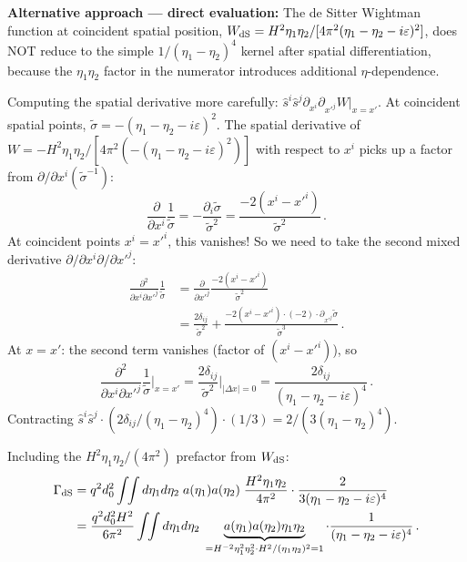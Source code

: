 \documentclass[12pt]{article}
\newcommand{\Scfac}{a}
\newcommand{\Wight}{W}
\begin{document}
\medskip

\noindent
\textbf{Alternative approach — direct evaluation:}
The de Sitter Wightman function at coincident spatial position,
$\Wight_{\rm dS} = H^{2}\eta_{1}\eta_{2}/[4\pi^{2}(\eta_{1}-\eta_{2}-i\varepsilon)^{2}]$,
does NOT reduce to the simple $1/(\eta_1-\eta_2)^4$ kernel after spatial differentiation,
because the $\eta_{1}\eta_{2}$ factor in the numerator introduces additional $\eta$-dependence.

Computing the spatial derivative more carefully:
$\hat{s}^{i}\hat{s}^{j}\partial_{x^i}\partial_{x'^j}\Wight|_{x=x'}$.
At coincident spatial points, $\tilde\sigma = -(\eta_1-\eta_2-i\varepsilon)^2$.
The spatial derivative of $\Wight = -H^{2}\eta_{1}\eta_{2}/[4\pi^{2}(-(\eta_1-\eta_2-i\varepsilon)^2)]$
with respect to $x^{i}$ picks up a factor from $\partial/\partial x^i(\tilde\sigma^{-1})$:
%
\begin{equation}
  \frac{\partial}{\partial x^{i}}\frac{1}{\tilde\sigma}
  =
  -\frac{\partial_i\tilde\sigma}{\tilde\sigma^{2}}
  =
  \frac{-2(x^{i}-x'^{i})}{\tilde\sigma^{2}} \,.
\end{equation}
%
At coincident points $x^{i}=x'^{i}$, this vanishes!  So we need to take the second
mixed derivative $\partial/\partial x^{i}\partial/\partial x'^{j}$:
%
\begin{align}
  \frac{\partial^{2}}{\partial x^{i}\partial x'^{j}}\frac{1}{\tilde\sigma}
  &=
  \frac{\partial}{\partial x'^{j}}\frac{-2(x^{i}-x'^{i})}{\tilde\sigma^{2}} \nonumber\\
  &=
  \frac{2\delta_{ij}}{\tilde\sigma^{2}}
  +\frac{-2(x^{i}-x'^{i})\cdot(-2)\cdot\partial_{x'^{j}}\tilde\sigma}{\tilde\sigma^{3}} \,.
\end{align}
%
At $x=x'$: the second term vanishes (factor of $(x^{i}-x'^{i})$), so
%
\begin{equation}
  \frac{\partial^{2}}{\partial x^{i}\partial x'^{j}}\frac{1}{\tilde\sigma}\bigg|_{x=x'}
  =
  \frac{2\delta_{ij}}{\tilde\sigma^{2}}\bigg|_{|\Delta x|=0}
  =
  \frac{2\delta_{ij}}{(\eta_{1}-\eta_{2}-i\varepsilon)^{4}} \,.
\end{equation}
%
Contracting $\hat{s}^{i}\hat{s}^{j}\cdot(2\delta_{ij}/(\eta_1-\eta_2)^4)\cdot(1/3)=2/(3(\eta_1-\eta_2)^4)$.

Including the $H^2\eta_1\eta_2/(4\pi^2)$ prefactor from $\Wight_{\rm dS}$:
%
\begin{align}
  \Gamma_{\rm dS}
  &=
  q^{2}d_{0}^{2}\int\!\!\int d\eta_{1}d\eta_{2}\;
  \Scfac(\eta_{1})\Scfac(\eta_{2})\;
  \frac{H^{2}\eta_{1}\eta_{2}}{4\pi^{2}}\cdot\frac{2}{3(\eta_{1}-\eta_{2}-i\varepsilon)^{4}} \nonumber\\
  &=
  \frac{q^{2}d_{0}^{2}H^{2}}{6\pi^{2}}
  \int\!\!\int d\eta_{1}d\eta_{2}\;
  \underbrace{\Scfac(\eta_{1})\Scfac(\eta_{2})\eta_{1}\eta_{2}}_{= H^{-2}\eta_{1}^{2}\eta_{2}^{2}\cdot H^{2}/(\eta_{1}\eta_{2})^{2} = 1}
  \cdot\frac{1}{(\eta_{1}-\eta_{2}-i\varepsilon)^{4}} \,.
\end{align}
\end{document}
